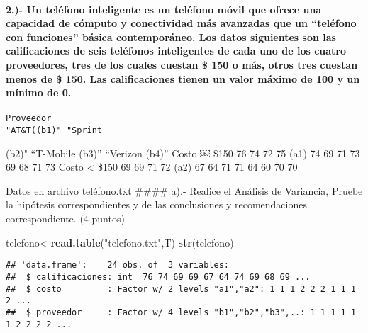 \documentclass[]{article}
\newenvironment{Shaded}{\begin{snugshade}}{\end{snugshade}}
\newcommand{\KeywordTok}[1]{\textcolor[rgb]{0.13,0.29,0.53}{\textbf{#1}}}
\newcommand{\NormalTok}[1]{#1}
\newcommand{\StringTok}[1]{\textcolor[rgb]{0.31,0.60,0.02}{#1}}
\let\oldparagraph\paragraph
\renewcommand{\paragraph}[1]{\oldparagraph{#1}\mbox{}}
\begin{document}
\hypertarget{un-telefono-inteligente-es-un-telefono-movil-que-ofrece-una-capacidad-de-computo-y-conectividad-mas-avanzadas-que-un-telefono-con-funciones-basica-contemporaneo.-los-datos-siguientes-son-las-calificaciones-de-seis-telefonos-inteligentes-de-cada-uno-de-los-cuatro-proveedores-tres-de-los-cuales-cuestan-150-o-mas-otros-tres-cuestan-menos-de-150.-las-calificaciones-tienen-un-valor-maximo-de-100-y-un-minimo-de-0.}{%
\paragraph{2.)- Un teléfono inteligente es un teléfono móvil que ofrece
una capacidad de cómputo y conectividad más avanzadas que un ``teléfono
con funciones'' básica contemporáneo. Los datos siguientes son las
calificaciones de seis teléfonos inteligentes de cada uno de los cuatro
proveedores, tres de los cuales cuestan \$ 150 o más, otros tres cuestan
menos de \$ 150. Las calificaciones tienen un valor máximo de 100 y un
mínimo de
0.}\label{un-telefono-inteligente-es-un-telefono-movil-que-ofrece-una-capacidad-de-computo-y-conectividad-mas-avanzadas-que-un-telefono-con-funciones-basica-contemporaneo.-los-datos-siguientes-son-las-calificaciones-de-seis-telefonos-inteligentes-de-cada-uno-de-los-cuatro-proveedores-tres-de-los-cuales-cuestan-150-o-mas-otros-tres-cuestan-menos-de-150.-las-calificaciones-tienen-un-valor-maximo-de-100-y-un-minimo-de-0.}}

\begin{verbatim}
Proveedor           
"AT&T((b1)" "Sprint
\end{verbatim}

(b2)" ``T-Mobile (b3)'' ``Verizon (b4)'' Costo ￼ \$150 76 74 72 75 (a1)
74 69 71 73 69 68 71 73 Costo \textless{} \$150 69 69 71 72 (a2) 67 64
71 71 64 60 70 70

Datos en archivo teléfono.txt \#\#\#\# a).- Realice el Análisis de
Variancia, Pruebe la hipótesis correspondientes y de las conclusiones y
recomendaciones correspondiente. (4 puntos)

\begin{Shaded}
\begin{Highlighting}[]
\NormalTok{telefono<-}\KeywordTok{read.table}\NormalTok{(}\StringTok{"telefono.txt"}\NormalTok{,T)}
\KeywordTok{str}\NormalTok{(telefono)}
\end{Highlighting}
\end{Shaded}

\begin{verbatim}
## 'data.frame':    24 obs. of  3 variables:
##  $ calificaciones: int  76 74 69 69 67 64 74 69 68 69 ...
##  $ costo         : Factor w/ 2 levels "a1","a2": 1 1 1 2 2 2 1 1 1 2 ...
##  $ proveedor     : Factor w/ 4 levels "b1","b2","b3",..: 1 1 1 1 1 1 2 2 2 2 ...
\end{verbatim}
\end{document}
